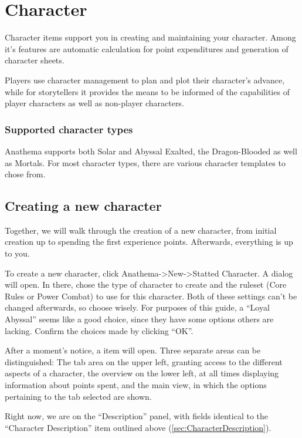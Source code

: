 \section{Character}
Character items support you in creating and maintaining your character. Among it's features are automatic calculation for point expenditures and generation of character sheets. 

Players use character management to plan and plot their character's advance, while for storytellers it provides the means to be informed of the capabilities of player characters as well as non-player characters.

\subsubsection*{Supported character types}
Anathema supports both Solar and Abyssal Exalted, the Dragon-Blooded as well as Mortals. For most character types, there are various character templates to chose from.

\subsection{Creating a new character}
Together, we will walk through the creation of a new character, from initial creation up to spending the first experience points. Afterwards, everything is up to you.

To create a new character, click Anathema->New->Statted Character. A dialog will open. In there, chose the type of character to create and the ruleset (Core Rules or Power Combat) to use for this character. Both of these settings can't be changed afterwards, so choose wisely.
For purposes of this guide, a ``Loyal Abyssal'' seems like a good choice, since they have some options others are lacking. Confirm the choices made by clicking ``OK''.

After a moment's notice, a item will open.
Three separate areas can be distinguished: The tab area on the upper left, granting access to the different aspects of a character, the overview on the lower left, at all times displaying information about points spent, and the main view, in which the options pertaining to the tab selected are shown.

Right now, we are on the ``Description'' panel, with fields identical to the ``Character Description'' item outlined above (\ref{sec:CharacterDescription}).

